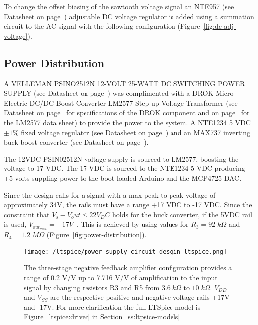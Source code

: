 \documentclass[12pt,journal]{IEEEtran}
\begin{document}
To change the offset biasing of the sawtooth voltage signal an NTE957 (see Datasheet on page~\pageref{datasheet:nte957}) adjustable DC voltage regulator is added using a summation circuit to the AC signal with the following configuration (Figure~\ref{fig:dc-adj-voltage}).

\subsection{Power Distribution}

A VELLEMAN PSINO2512N 12-VOLT 25-WATT DC SWITCHING POWER SUPPLY (see Datasheet on page~\pageref{datasheet:psino2512n}) was complimented with a DROK Micro Electric DC/DC Boost Converter LM2577 Step-up Voltage Transformer (see Datasheet on page~\pageref{datasheet:drok} for specifications of the DROK component and on page~\pageref{datasheet:lm2577} for the LM2577 data sheet) to provide the power to the system. A NTE1234 5 VDC $\pm 1\%$ fixed voltage regulator (see Datasheet on page~\pageref{datasheet:nte941m}) and an MAX737 inverting buck-boost converter (see Datasheet on page~\pageref{datasheet:max737}). 

The 12VDC PSIN02512N voltage supply is sourced to LM2577, boosting the voltage to 17 VDC. The 17 VDC is sourced to the NTE1234 5-VDC producing +5 volts suppling power to the boot-loaded Arduino and the MCP4725 DAC. 

Since the design calls for a signal with a max peak-to-peak voltage of approximately 34V, the rails must have a range +17 VDC to -17 VDC. Since the constraint that $V_s - V_out \leq 22 V_DC$ holds for the buck converter, if the 5VDC rail is used, $V_{out_{max}} = -17 V$~\cite{datasheet_max635}. This is achieved by using values for $R_3 = 92\;k\Omega$ and $R_4 = 1.2\;M\Omega$ (Figure~\ref{fig:power-distribution}). 

\begin{figure}[tb]
  \centering
	\texttt{[image: /ltspice/power-supply-circuit-desgin-ltspice.png]}
	\caption[Cavity Mounts]{The three-stage negative feedback amplifier configuration provides a range of 0.2 V/V up to 7.716 V/V of amplification to the input signal by changing resistors R3 and R5 from $3.6\;k\Omega$ to $10\;k\Omega$. $V_{DD}$ and $V_{SS}$ are the respective positive and negative voltage rails +17V and -17V. For more clarification the full LTSpice model is Figure~\ref{ltspice:driver} in Section~\ref{ss:ltpsice-models}}
	\label{fig:amplifier-configuration}
\end{figure}
\end{document}
